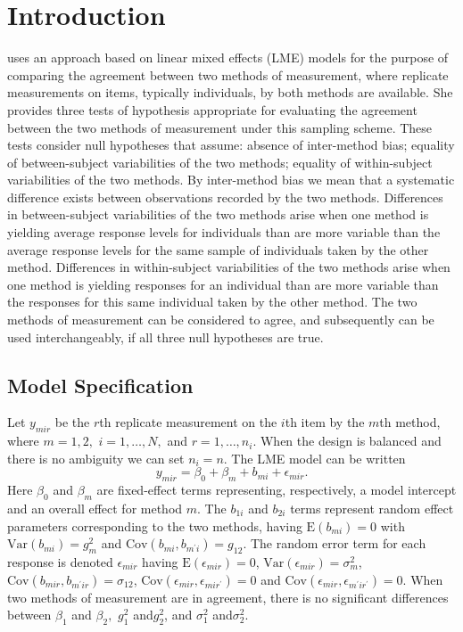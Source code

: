 \documentclass[12pt, a4paper]{report}
\theoremstyle{plain}
\theoremstyle{definition}
\theoremstyle{remark}
\begin{document}



	\section{Introduction}
	
	\citet{AARoy20092009} uses an approach based on linear mixed effects (LME) models for the purpose of comparing the agreement between two methods of measurement, where replicate measurements on items, typically individuals, by both methods are available. She provides three tests of hypothesis appropriate for evaluating the agreement between the two methods of measurement under this sampling scheme. These tests consider null hypotheses that assume: absence of inter-method bias; equality of between-subject variabilities of the two methods; equality of within-subject variabilities of the two methods. By inter-method bias we mean that a systematic difference exists between observations recorded by the two methods. Differences in between-subject variabilities of the two methods arise when one method is yielding average response levels for individuals than are more variable than the average response levels for the same sample of individuals taken by the other method.  Differences in within-subject variabilities of the two methods arise when one method is yielding responses for an individual than are more variable than the responses for this same individual taken by the other method. The two methods of measurement can be considered to agree, and subsequently can be used interchangeably, if all three null hypotheses are true.
	
	\subsection{Model Specification}
	Let $y_{mir} $ be the $r$th replicate measurement on the $i$th item by the $m$th method, where $m=1,2,$ $i=1,\ldots,N,$ and $r = 1,\ldots,n_i.$ When the design is balanced and there is no ambiguity we can set $n_i=n.$ The LME model can be written
	\begin{equation}
	y_{mir} = \beta_{0} + \beta_{m} + b_{mi} + \epsilon_{mir}.
	\end{equation}
	Here $\beta_0$ and $\beta_m$ are fixed-effect terms representing, respectively, a model intercept and an overall effect for method $m.$ The $b_{1i}$ and $b_{2i}$ terms represent random effect parameters corresponding to the two methods, having $\mathrm{E}(b_{mi})=0$ with $\mathrm{Var}(b_{mi})=g^2_m$ and $\mathrm{Cov}(b_{mi}, b_{m^\prime i})=g_{12}.$ The random error term for each response is denoted $\epsilon_{mir}$ having $\mathrm{E}(\epsilon_{mir})=0$, $\mathrm{Var}(\epsilon_{mir})=\sigma^2_m$, $\mathrm{Cov}(b_{mir}, b_{m^\prime ir})=\sigma_{12}$, $\mathrm{Cov}(\epsilon_{mir}, \epsilon_{mir^\prime})= 0$ and $\mathrm{Cov}(\epsilon_{mir}, \epsilon_{m^\prime ir^\prime})= 0.$
	When two methods of measurement are in agreement, there is no significant differences between $\beta_1$ and $\beta_2,$ $g^2_1 $ and$ g^2_2$, and $\sigma^2_1 $ and$ \sigma^2_2$.
	\bigskip
	
\end{document}
